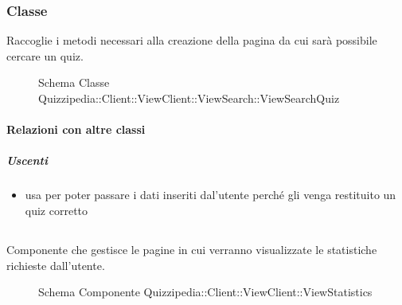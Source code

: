 \subsubsection{Classe }
Raccoglie i metodi necessari alla creazione della pagina da cui sarà possibile cercare un quiz.
\begin{figure}[H]
\centering
\noindent{}
\caption[Schema Classe ViewSearchQuiz]{Schema Classe Quizzipedia::Client::ViewClient::ViewSearch::ViewSearchQuiz}
\end{figure}
\paragraph{Relazioni con altre classi}
\subparagraph{Uscenti}
\begin{itemize}
\item usa  per poter passare i dati inseriti dal'utente perché gli venga restituito un quiz corretto
\end{itemize}
\subsection{}
Componente che gestisce le pagine in cui verranno visualizzate le statistiche richieste dall'utente.
\begin{figure}[H]
\centering
\noindent{}
\caption[Schema Componente Quizzipedia::Client::ViewClient::ViewStatistics]{Schema Componente Quizzipedia::Client::ViewClient::ViewStatistics}
\end{figure}
